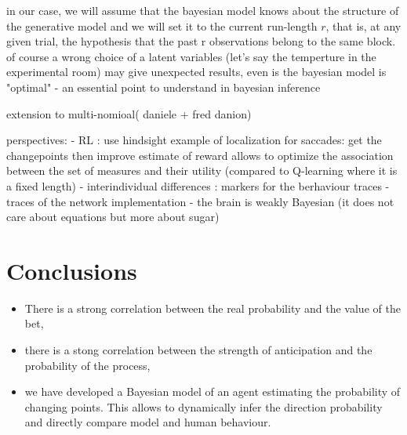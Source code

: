 \documentclass[profile,final,english, draft]{article}%
\newcommand{\citep}[1]{(\cite{#1})}
\begin{document}
in our case, we will assume that the bayesian model knows about the structure of the generative model and we will set it to the current run-length $r$, that is, at any given trial, the hypothesis that the past r observations belong to the same block. of course a wrong choice of a latent variables (let's say the temperture in the experimental room) may give unexpected results, even is the bayesian model is "optimal" - an essential point to understand in bayesian inference

extension to multi-nomioal( daniele + fred danion)





perspectives:
- RL : use hindsight example of localization for saccades: get the changepoints then improve estimate of reward allows to optimize the association between the set of measures and their utility (compared to Q-learning where it is a fixed length)
- interindividual differences : markers for the berhaviour traces - traces of the network implementation
- the brain is weakly Bayesian (it does not care about equations but more about sugar)



\section{Conclusions}


\begin{itemize}\setlength{\itemsep}{0ex}
\item There is a strong correlation between the real probability and the value of the bet,

\item there is a stong correlation between the strength of anticipation and the probability of the process,

\item we have developed a Bayesian model of an agent estimating the probability of changing points. This allows to dynamically infer the direction probability and directly compare model and human behaviour.

\end{itemize}

{\tiny
\printbibliography
}
\end{document}
